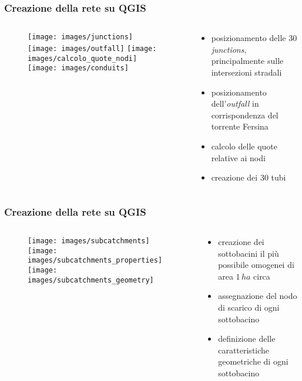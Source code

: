 \documentclass{beamer}
\begin{document}
\begin{frame}
 \frametitle{Creazione della rete su QGIS}
 
 \begin{columns}
  \begin{column}{.5\textwidth}
   \begin{figure}
    \centering  
    \begin{overprint}
     \texttt{[image: images/junctions]}
     \texttt{[image: images/outfall]}
     \texttt{[image: images/calcolo\_quote\_nodi]}
     \texttt{[image: images/conduits]}
    \end{overprint}
   \end{figure}
  \end{column}
  
  \begin{column}{.5\textwidth}
   \begin{itemize}[<+->]
    \item posizionamento delle $30$ \emph{junctions}, principalmente sulle intersezioni stradali
    \item posizionamento dell'\emph{outfall} in corrispondenza del torrente Fersina
     \item calcolo delle quote relative ai nodi
     \item creazione dei 30 tubi
   \end{itemize}
  \end{column}
 \end{columns}
\end{frame}

\begin{frame}
 \frametitle{Creazione della rete su QGIS}
 
 \begin{columns}
  \begin{column}{.5\textwidth}
   \begin{figure}
    \centering  
    \begin{overprint}
     \texttt{[image: images/subcatchments]}
      \texttt{[image: images/subcatchments\_properties]}
      \texttt{[image: images/subcatchments\_geometry]}
    \end{overprint}
   \end{figure}
  \end{column}
  
  \begin{column}{.5\textwidth}
   \begin{itemize}[<+->]
    \item creazione dei sottobacini il più possibile omogenei di area $1\,ha$ circa
     \item assegnazione del nodo di scarico di ogni sottobacino
     \item definizione delle caratteristiche geometriche di ogni sottobacino
   \end{itemize}
  \end{column}
 \end{columns}
\end{frame}
\end{document}
